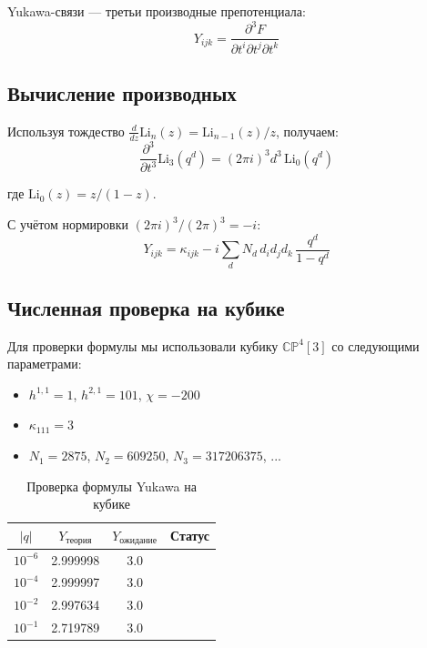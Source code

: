 \documentclass[12pt,a4paper,twoside]{article}
\newcommand{\checkmarkgreen}{\textcolor{emerald}{\checkmark}}
\theoremstyle{definition}
\begin{document}
Yukawa-связи — третьи производные препотенциала:
\begin{equation}
Y_{ijk} = \frac{\partial^3 F}{\partial t^i \partial t^j \partial t^k}
\label{eq:yukawa_derivative}
\end{equation}

\subsection{Вычисление производных}

Используя тождество $\frac{d}{dz}\text{Li}_n(z) = \text{Li}_{n-1}(z)/z$, получаем:
\begin{equation}
\frac{\partial^3}{\partial t^3} \text{Li}_3(q^d) = (2\pi i)^3 d^3 \, \text{Li}_0(q^d)
\end{equation}

где $\text{Li}_0(z) = z/(1-z)$.

С учётом нормировки $(2\pi i)^3/(2\pi)^3 = -i$:
\begin{equation}
\boxed{
Y_{ijk} = \kappa_{ijk} - i \sum_d N_d \, d_i d_j d_k \, \frac{q^d}{1 - q^d}
}
\label{eq:yukawa_final}
\end{equation}

\subsection{Численная проверка на кубике}

Для проверки формулы мы использовали кубику $\mathbb{CP}^4[3]$ со следующими параметрами:
\begin{itemize}
    \item $h^{1,1} = 1$, $h^{2,1} = 101$, $\chi = -200$
    \item $\kappa_{111} = 3$
    \item $N_1 = 2875$, $N_2 = 609250$, $N_3 = 317206375$, ...
\end{itemize}

\begin{table}[H]
\centering
\small
\caption{Проверка формулы Yukawa на кубике}
\label{tab:yukawa_check}
\begin{tabular}{c|c|c|c}
\toprule
\textbf{$|q|$} & \textbf{$Y_{\text{теория}}$} & \textbf{$Y_{\text{ожидание}}$} & \textbf{Статус} \\
\midrule
$10^{-6}$ & 2.999998 & 3.0 & \checkmarkgreen \\
$10^{-4}$ & 2.999997 & 3.0 & \checkmarkgreen \\
$10^{-2}$ & 2.997634 & 3.0 & \checkmarkgreen \\
$10^{-1}$ & 2.719789 & 3.0 & \checkmarkgreen \\
\bottomrule
\end{tabular}
\end{table}
\end{document}

